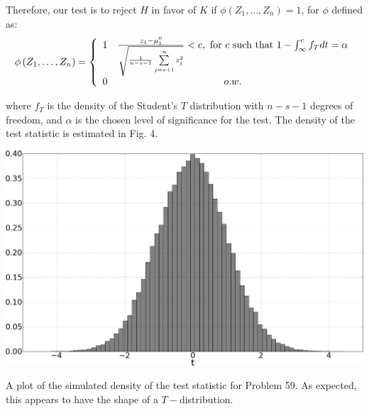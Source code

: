 \begin{homeworkProblem}
Therefore, our test is to reject $H$ in favor of $K$ if $\phi \left( 
{Z_1 , \ldots ,Z_n } \right) = 1$, for $\phi$ defined as: 
\[
\phi \left( {Z_1 , \ldots ,Z_n } \right) = \left\{ 
{\begin{array}{*{20}c}
   1 & {\frac{{z_1  - \mu _1^0 }}
{{\sqrt {\frac{1}
{{n - s - 1}}\sum\limits_{j = s + 1}^n {z_j^2 } } }} < c,{\text{ for 
}}c{\text{ such that }}1 - \int_\infty ^c {f_T } dt = \alpha }  \\
   0 & {o.w.}  \\

 \end{array} } \right.
\]

where $f_T$ is the density of the Student's $T$ distribution with $n-
s-1$ degrees of freedom, and $\alpha$ is the chosen level of 
significance for the test.
The density of the test statistic is estimated in Fig. 4.
\begin{figurehere}
\centering
\includegraphics[width=.9\columnwidth]{59.png}
\caption{A plot of the simulated density of the test statistic for 
Problem 59. As expected, this appears to have the shape of a $T-
$distribution.}
\end{figurehere}
\end{homeworkProblem}

